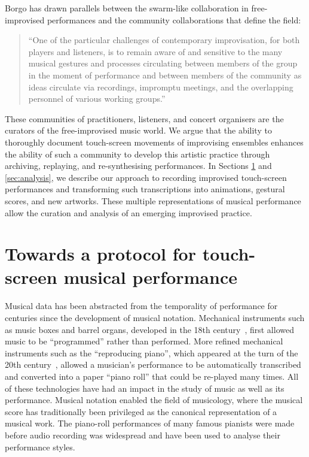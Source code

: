\documentclass[graybox]{svmult}
\begin{document}
Borgo has drawn parallels between the swarm-like collaboration in
free-improvised performances and the community collaborations that
define the field: 
\begin{quote}
``One of the particular challenges of contemporary
improvisation, for both players and listeners, is to remain aware of
and sensitive to the many musical gestures and processes circulating
between members of the group in the moment of performance and between
members of the community as ideas circulate via recordings, impromptu
meetings, and the overlapping personnel of various working
groups.''~\cite{Borgo:2006fv} 
\end{quote}
These communities of practitioners, listeners, and concert organisers
are the curators of the free-improvised music world. We argue that the
ability to thoroughly document touch-screen movements of improvising
ensembles enhances the ability of such a community to develop this
artistic practice through archiving, replaying, and re-synthesising
performances. In Sections \ref{sec:protocols} and \ref{sec:analysis},
we describe our approach to recording improvised touch-screen
performances and transforming such transcriptions into animations,
gestural scores, and new artworks. These multiple representations of
musical performance allow the curation and analysis of an emerging
improvised practice.

\section{Towards a protocol for touch-screen musical performance}
\label{sec:protocols}


Musical data has been abstracted from the temporality of performance
for centuries since the development of musical notation. Mechanical
instruments such as music boxes and barrel organs, developed in the
18th century~\cite{Fowler:1967kq}, first allowed music to be
``programmed'' rather than performed. More refined mechanical
instruments such as the ``reproducing piano'', which appeared at the
turn of the 20th century~\cite{Kapur:2005fk}, allowed a musician's
performance to be automatically transcribed and converted into a paper
``piano roll'' that could be re-played many times. All of these
technologies have had an impact in the study of music as well as its
performance. Musical notation enabled the field of musicology, where
the musical score has traditionally been privileged as the canonical
representation of a musical work. The piano-roll performances of many
famous pianists were made before audio recording was widespread and
have been used to analyse their performance styles.
\end{document}
